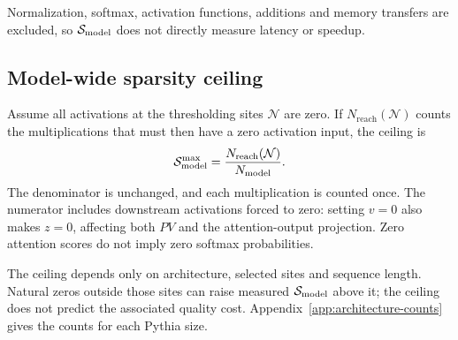 Normalization, softmax, activation functions, additions and memory transfers
are excluded, so $\mathcal{S}_{\mathrm{model}}$ does not directly measure latency or speedup.

\subsection{Model-wide sparsity ceiling}
\label{app:ceiling}

Assume all activations at the thresholding sites $\mathcal{N}$ are zero.
If $N_{\mathrm{reach}}(\mathcal{N})$ counts the multiplications that must
then have a zero activation input, the ceiling is
\begin{equation}
\mathcal{S}_{\mathrm{model}}^{\max}=\frac{N_{\mathrm{reach}}(\mathcal{N})}{N_{\mathrm{model}}}.
\end{equation}
The denominator is unchanged, and each multiplication is counted once.
The numerator includes downstream activations forced to zero: setting
$v=0$ also makes $z=0$, affecting both $PV$ and the attention-output projection.
Zero attention scores do not imply zero softmax probabilities.

The ceiling depends only on architecture, selected sites and sequence length.
Natural zeros outside those sites can raise measured $\mathcal{S}_{\mathrm{model}}$ above it;
the ceiling does not predict the associated quality cost.
Appendix~\ref{app:architecture-counts} gives the counts for each Pythia size.
